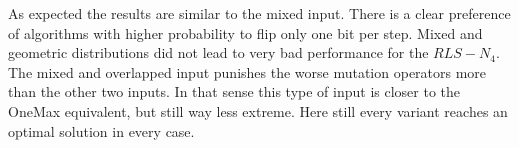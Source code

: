 As expected the results are similar to the mixed input.
There is a clear preference of algorithms with higher probability to flip only one bit per step.
Mixed and geometric distributions did not lead to very bad performance for the $RLS-N_4$.
The mixed and overlapped input punishes the worse mutation operators more than the other two inputs.
In that sense this type of input is closer to the OneMax equivalent, but still way less extreme.
Here still every variant reaches an optimal solution in every case.